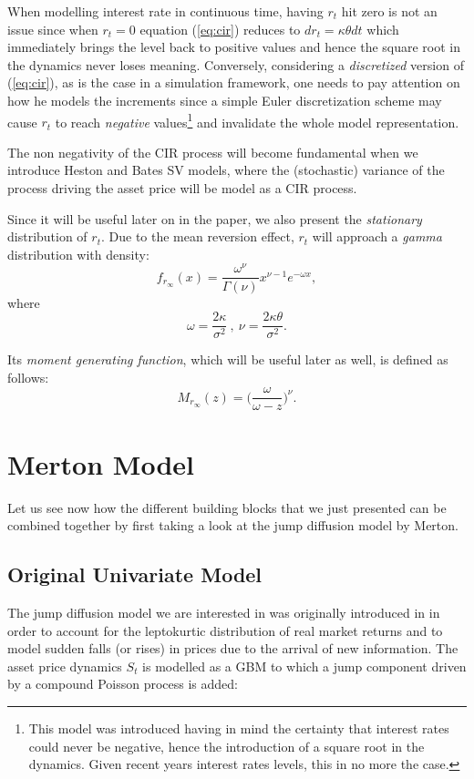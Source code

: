 When modelling interest rate in continuous time, having $r_t$ hit zero is not an issue since when $r_t=0$ equation (\ref{eq:cir}) reduces to $dr_t = \kappa\theta dt$ which immediately brings the level back to positive values and hence the square root in the dynamics never loses meaning. Conversely, considering a \textit{discretized} version of (\ref{eq:cir}), as is the case in a simulation framework, one needs to pay attention on how he models the increments since a simple Euler discretization scheme may cause $r_t$ to reach \textit{negative} values\footnote{This model was introduced having in mind the certainty that interest rates could never be negative, hence the introduction of a square root in the dynamics. Given recent years interest rates levels, this in no more the case.} and invalidate the whole model representation.

The non negativity of the CIR process will become fundamental when we introduce Heston and Bates SV models, where the (stochastic) variance of the process driving the asset price will be model as a CIR process.

Since it will be useful later on in the paper, we also present the \textit{stationary} distribution of $r_t$. Due to the mean reversion effect, $r_t$ will approach a \textit{gamma} distribution with density:
\begin{equation}
\label{eq:cir_pdf}
f_{r_\infty}(x) = \frac{\omega^\nu}{\Gamma(\nu)} x^{\nu-1}e^{-\omega x},
\end{equation}
where
\begin{equation*}
\omega= \frac{2\kappa}{\sigma^2}\: , \: \nu= \frac{2\kappa\theta}{\sigma^2}.
\end{equation*}

Its \textit{moment generating function}, which will be useful later as well, is defined as follows:
\begin{equation}
\label{eq:cir_mgf}
	M_{r_\infty}(z) = \Big(\frac{\omega}{\omega-z}\Big)^\nu .
\end{equation}

\bigskip
\section{Merton Model}
\label{sec:merton}
Let us see now how the different building blocks that we just presented can be combined together by first taking a look at the jump diffusion model by Merton.

\subsection{Original Univariate Model}
The jump diffusion model we are interested in was originally introduced in \citep{MERTON1976} in order to account for the leptokurtic distribution of real market returns and to model sudden falls (or rises) in prices due to the arrival of new information.
The asset price dynamics $S_t$ is modelled as a GBM to which a jump component driven by a compound Poisson process is added:

